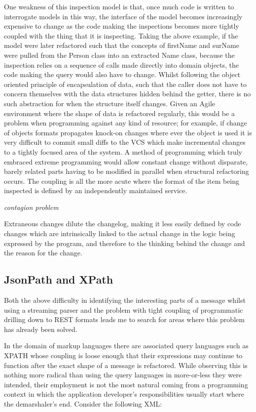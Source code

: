 \documentclass[]{article}
\begin{document}
One weakness of this inspection model is that, once much code is written
to interrogate models in this way, the interface of the model becomes
increasingly expensive to change as the code making the inspections
becomes more tightly coupled with the thing that it is inspecting.
Taking the above example, if the model were later refactored such that
the concepts of firstName and surName were pulled from the Person class
into an extracted Name class, because the inspection relies on a
sequence of calls made directly into domain objects, the code making the
query would also have to change. Whilst following the object oriented
principle of encapsulation of data, such that the caller does not have
to concern themselves with the data structures hidden behind the getter,
there is no such abstraction for when the structure itself changes.
Given an Agile environment where the shape of data is refactored
regularly, this would be a problem when programming against any kind of
resource; for example, if change of objects formats propagates knock-on
changes where ever the object is used it is very difficult to commit
small diffs to the VCS which make incremental changes to a tightly
focused area of the system. A method of programming which truly embraced
extreme programming would allow constant change without disparate,
barely related parts having to be modified in parallel when structural
refactoring occurs. The coupling is all the more acute where the format
of the item being inspected is defined by an independently maintained
service.

\emph{contagion problem}

Extraneous changes dilute the changelog, making it less easily defined
by code changes which are intrinsically linked to the actual change in
the logic being expressed by the program, and therefore to the thinking
behind the change and the reason for the change.

\subsection{JsonPath and XPath}

Both the above difficulty in identifying the interesting parts of a
message whilst using a streaming parser and the problem with tight
coupling of programmatic drilling down to REST formats leads me to
search for areas where this problem has already been solved.

In the domain of markup languages there are associated query languages
such as XPATH whose coupling is loose enough that their expressions may
continue to function after the exact shape of a message is refactored.
While observing this is nothing more radical than using the query
languages in more-or-less they were intended, their employment is not
the most natural coming from a programming context in which the
application developer's responsibilities usually start where the
demarshaler's end. Consider the following XML:
\end{document}
